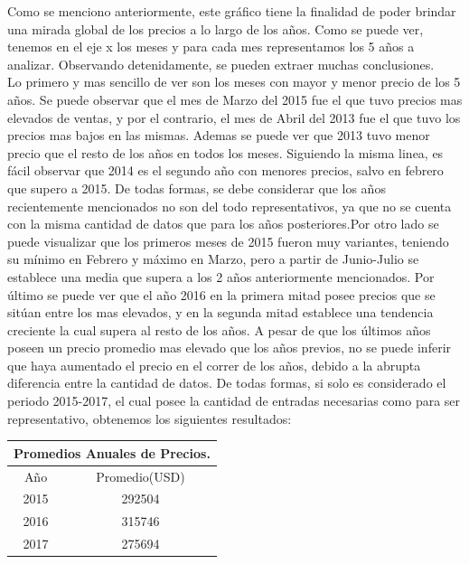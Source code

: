 \documentclass[a4paper, 10pt]{article}
\newcommand\tab[1][0.5cm]{\hspace*{#1}}
\begin{document}
        		\tab Como se menciono anteriormente, este gráfico tiene la finalidad de poder brindar una mirada global de los precios a
        		lo largo de los años. Como se puede ver, tenemos en el eje x los meses y para cada mes representamos los 5 años a
        		analizar. Observando detenidamente, se pueden extraer muchas conclusiones. \\
			\tab Lo primero y mas sencillo de ver son los meses con mayor y menor precio de los 5 años. Se puede observar que el 
			mes de Marzo del 2015 fue el que tuvo precios mas elevados de ventas, y por el contrario, el mes de Abril del 2013 
			fue el que tuvo los precios mas bajos en las mismas. Ademas se puede ver que 2013 tuvo menor precio que el resto de
			los años en todos los meses. Siguiendo la misma linea, es fácil observar que 2014 es el segundo año con menores precios,
			salvo en febrero que supero a 2015. De todas formas, se debe considerar que los años recientemente mencionados no son
			del todo representativos, ya que no se cuenta con la misma cantidad de datos que para los años posteriores.Por otro
			lado se puede visualizar que los primeros meses de 2015 fueron muy variantes, teniendo su mínimo en Febrero y máximo
			en Marzo, pero a partir de Junio-Julio se establece una media que supera a los 2 años anteriormente mencionados.
			Por último se puede ver que el año 2016 en la primera mitad posee precios que se sitúan entre los mas elevados, y
			en la segunda mitad establece una tendencia creciente la cual supera al resto de los años.
       		\tab A pesar de que los últimos años poseen un precio promedio mas elevado que los años previos, no se puede inferir
       		que haya aumentado el precio en el correr de los años, debido a la abrupta diferencia entre la cantidad de datos. De
       		todas formas, si solo es considerado el periodo 2015-2017, el cual posee la cantidad de entradas necesarias como para
       		ser representativo, obtenemos los siguientes resultados:
       		\begin{center}
       			\begin{tabular}{ |c|c| }
       			\hline
       			\multicolumn{2}{|c|}{Promedios Anuales de Precios.}\\
       			\hline
       			\hline
       			Año & Promedio(USD)\\
       			\hline
       			2015 & 292504 \\
       			2016 & 315746 \\
       			2017 & 275694 \\
       			\hline
	          	\end{tabular}
	      	\end{center}
     
\end{document}
